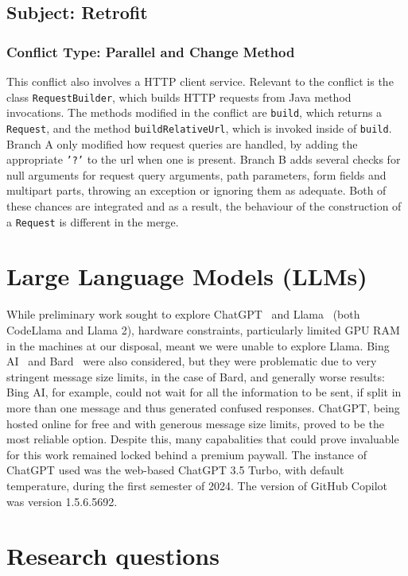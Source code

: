 \subsection{Subject: Retrofit}

\subsubsection{Conflict Type: Parallel and Change Method}

This conflict also involves a HTTP client service. Relevant to the conflict is the class \texttt{RequestBuilder}, which builds HTTP requests from Java method invocations. The methods modified
in the conflict are \texttt{build}, which returns a \texttt{Request}, and the method \texttt{buildRelativeUrl}, which is invoked inside of \texttt{build}.
Branch A only modified how request queries are handled, by adding the appropriate \texttt{'?'} to the url when one is present.
Branch B adds several checks for null arguments for request query arguments, path parameters, form fields and multipart parts, throwing an exception or ignoring them as adequate.
Both of these chances are integrated and as a result, the behaviour of the construction of a \texttt{Request} is different in the merge.

\section{Large Language Models (LLMs)}

While preliminary work sought to explore ChatGPT~\cite{kn:gpt} and Llama~\cite{kn:llama} (both CodeLlama and Llama 2), hardware constraints, particularly limited GPU RAM in the machines at our disposal, meant we were unable to explore Llama.  Bing AI~\cite{kn:bingAI} and Bard~\cite{kn:bard} were also considered, but they were problematic due to very stringent message size limits, in the case of Bard, and generally worse results: Bing AI, for example, could not wait for all the information to be sent, if split in more than one message and thus generated confused responses. ChatGPT, being hosted online for free and with generous message size limits, proved to be the most reliable option. Despite this, many capabalities that could prove invaluable for this work remained locked behind a premium paywall.
The instance of ChatGPT used was the web-based ChatGPT 3.5 Turbo, with default temperature, during the first semester of 2024.
The version of GitHub Copilot was version 1.5.6.5692.

\section{Research questions}

